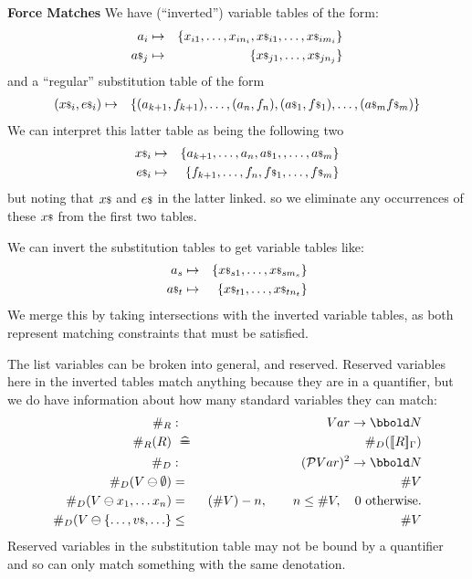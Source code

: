 \textbf{Force Matches}
We have (``inverted'') variable tables of the form:
 \begin{eqnarray*}
   a_i &\mapsto& \{x_{i1},\ldots,x_{in_i}, {x}{\scriptstyle\$}_{i1},\ldots,{x}{\scriptstyle\$}_{im_i}\}
 \\ {a}{\scriptstyle\$}_j &\mapsto& \{ {x}{\scriptstyle\$}_{j1},\ldots,{x}{\scriptstyle\$}_{jn_j}\}
 \end{eqnarray*}
and a ``regular'' substitution table of the form
\begin{eqnarray*}
   ({x}{\scriptstyle\$}_i,{e}{\scriptstyle\$}_i) &\mapsto&
     \{(a_{k+1},f_{k+1}),\ldots,(a_n,f_n), ({a}{\scriptstyle\$}_1,{f}{\scriptstyle\$}_1),\ldots,({a}{\scriptstyle\$}_m{f}{\scriptstyle\$}_m)\}
\end{eqnarray*}
We can interpret this latter table as being the following two
\begin{eqnarray*}
   {x}{\scriptstyle\$}_i &\mapsto&
    \{a_{k+1},\ldots,a_n,{a}{\scriptstyle\$}_1,,\ldots,{a}{\scriptstyle\$}_m\}
\\ {e}{\scriptstyle\$}_i &\mapsto&
    \{f_{k+1},\ldots,f_n, {f}{\scriptstyle\$}_1,\ldots,{f}{\scriptstyle\$}_m\}
\end{eqnarray*}
but noting that ${x}{\scriptstyle\$}$ and ${e}{\scriptstyle\$}$ in the latter linked.
so we eliminate any occurrences of these ${x}{\scriptstyle\$}$ from the first two tables.

We can invert the substitution tables to get variable tables like:
 \begin{eqnarray*}
    a_s &\mapsto& \{{x}{\scriptstyle\$}_{s1},\ldots,{x}{\scriptstyle\$}_{sm_s}\}
  \\ {a}{\scriptstyle\$}_t &\mapsto& \{ {x}{\scriptstyle\$}_{t1},\ldots,{x}{\scriptstyle\$}_{tn_t}\}
 \end{eqnarray*}
We merge this by taking intersections with the inverted variable
tables, as both represent matching constraints that must be satisfied.

The list variables can be broken into general, and reserved.
  Reserved variables here in the inverted tables
  match anything because they are in a quantifier,
  but we do have information about how many standard variables they can
  match:
  \begin{eqnarray*}
     \#_R &:& Var \fun \Nat
  \\ \#_R(R) &\defs& \#_D(\sem{R}_\Gamma)
  \\ \#_D &:& (\power Var)^2 \fun \Nat
  \\ \#_D(V\ominus \emptyset ) &=& \# V
  \\ \#_D(V \ominus x_1,\ldots x_n) &=& (\# V) - n, \qquad n \leq \# V, \quad 0~ \otherwise.
  \\ \#_D(V \ominus \setof{\ldots,\lst v,\ldots} &\leq& \# V
  \end{eqnarray*}
  Reserved variables in the substitution table may not be bound by a quantifier
  and so can only match something with the same denotation.


